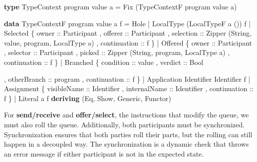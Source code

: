 \documentclass[runningheads]{llncs}
\newenvironment{Shaded}{}{}
\newcommand{\KeywordTok}[1]{\textcolor[rgb]{0.00,0.44,0.13}{\textbf{#1}}}
\newcommand{\DataTypeTok}[1]{\textcolor[rgb]{0.56,0.13,0.00}{#1}}
\newcommand{\OtherTok}[1]{\textcolor[rgb]{0.00,0.44,0.13}{#1}}
\newcommand{\FunctionTok}[1]{\textcolor[rgb]{0.02,0.16,0.49}{#1}}
\newcommand{\NormalTok}[1]{#1}
\begin{document}
\begin{Shaded}
\begin{Highlighting}[]
\KeywordTok{type} \DataTypeTok{TypeContext}\NormalTok{ program value a }\FunctionTok{=} 
    \DataTypeTok{Fix}\NormalTok{ (}\DataTypeTok{TypeContextF}\NormalTok{ program value a)}

\KeywordTok{data} \DataTypeTok{TypeContextF}\NormalTok{ program value a f }
    \FunctionTok{=} \DataTypeTok{Hole} 
    \FunctionTok{|} \DataTypeTok{LocalType}\NormalTok{ (}\DataTypeTok{LocalTypeF}\NormalTok{ a ()) f }
    \FunctionTok{|} \DataTypeTok{Selected} 
\NormalTok{        \{}\OtherTok{ owner ::} \DataTypeTok{Participant}
\NormalTok{        ,}\OtherTok{ offerer ::} \DataTypeTok{Participant} 
\NormalTok{        ,}\OtherTok{ selection ::} \DataTypeTok{Zipper}\NormalTok{ (}\DataTypeTok{String}\NormalTok{, value, program, }\DataTypeTok{LocalType}\NormalTok{ a)}
\NormalTok{        ,}\OtherTok{ continuation ::}\NormalTok{ f }
\NormalTok{        \}}
    \FunctionTok{|} \DataTypeTok{Offered} 
\NormalTok{        \{}\OtherTok{ owner ::} \DataTypeTok{Participant}
\NormalTok{        ,}\OtherTok{ selector ::} \DataTypeTok{Participant} 
\NormalTok{        ,}\OtherTok{ picked ::} \DataTypeTok{Zipper}\NormalTok{ (}\DataTypeTok{String}\NormalTok{, program, }\DataTypeTok{LocalType}\NormalTok{ a)}
\NormalTok{        ,}\OtherTok{ continuation ::}\NormalTok{ f }
\NormalTok{        \}}
    \FunctionTok{|} \DataTypeTok{Branched} 
\NormalTok{        \{}\OtherTok{ condition ::}\NormalTok{ value}
\NormalTok{        ,}\OtherTok{ verdict ::} \DataTypeTok{Bool}
   
\NormalTok{         ,}\OtherTok{ otherBranch ::}\NormalTok{ program}
\NormalTok{        ,}\OtherTok{ continuation ::}\NormalTok{ f }
\NormalTok{        \}}
    \FunctionTok{|} \DataTypeTok{Application} \DataTypeTok{Identifier} \DataTypeTok{Identifier}\NormalTok{ f }
    \FunctionTok{|} \DataTypeTok{Assignment} 
\NormalTok{        \{}\OtherTok{ visibleName ::} \DataTypeTok{Identifier}
\NormalTok{        ,}\OtherTok{ internalName ::} \DataTypeTok{Identifier}
\NormalTok{        ,}\OtherTok{ continuation ::}\NormalTok{ f }
\NormalTok{        \}}
    \FunctionTok{|} \DataTypeTok{Literal}\NormalTok{ a f}
    \KeywordTok{deriving}\NormalTok{ (}\DataTypeTok{Eq}\NormalTok{, }\DataTypeTok{Show}\NormalTok{, }\DataTypeTok{Generic}\NormalTok{, }\DataTypeTok{Functor}\NormalTok{)}
\end{Highlighting}
\end{Shaded}

For \textbf{send/receive} and \textbf{offer/select}, the instructions
that modify the queue, we must also roll the queue. Additionally, both
participants must be synchronized. Synchronization ensures that both
parties roll their parts, but the rolling can still happen in a
decoupled way. The synchronization is a dynamic check that throws an
error message if either participant is not in the expected state.
\end{document}
